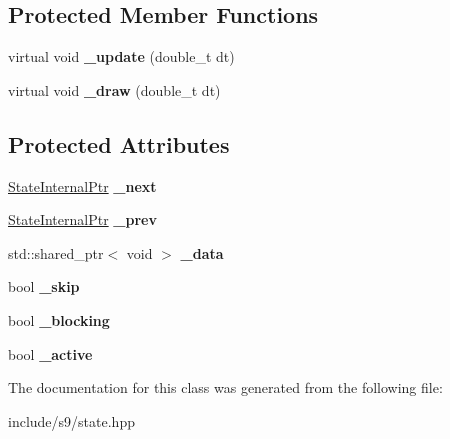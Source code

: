 \subsection*{\-Protected \-Member \-Functions}
\begin{DoxyCompactItemize}
\item 
\hypertarget{classs9_1_1State_a0d4e78ab84765021a534b8fb6dcc5497}{virtual void {\bfseries \-\_\-update} (double\-\_\-t dt)}\label{classs9_1_1State_a0d4e78ab84765021a534b8fb6dcc5497}

\item 
\hypertarget{classs9_1_1State_a1d85c69d1c6be10a66fef1322ec6866e}{virtual void {\bfseries \-\_\-draw} (double\-\_\-t dt)}\label{classs9_1_1State_a1d85c69d1c6be10a66fef1322ec6866e}

\end{DoxyCompactItemize}
\subsection*{\-Protected \-Attributes}
\begin{DoxyCompactItemize}
\item 
\hypertarget{classs9_1_1State_aaeb51975049bf02a4b32c7fdf9f4b816}{\hyperlink{classs9_1_1State}{\-State\-Internal\-Ptr} {\bfseries \-\_\-next}}\label{classs9_1_1State_aaeb51975049bf02a4b32c7fdf9f4b816}

\item 
\hypertarget{classs9_1_1State_a650c0737d8dce6939b36a680690a1d02}{\hyperlink{classs9_1_1State}{\-State\-Internal\-Ptr} {\bfseries \-\_\-prev}}\label{classs9_1_1State_a650c0737d8dce6939b36a680690a1d02}

\item 
\hypertarget{classs9_1_1State_ae9a215471150db3a80b843fabc80ce7c}{std\-::shared\-\_\-ptr$<$ void $>$ {\bfseries \-\_\-data}}\label{classs9_1_1State_ae9a215471150db3a80b843fabc80ce7c}

\item 
\hypertarget{classs9_1_1State_af619a178ddde7b8648838300d4632760}{bool {\bfseries \-\_\-skip}}\label{classs9_1_1State_af619a178ddde7b8648838300d4632760}

\item 
\hypertarget{classs9_1_1State_a7ada53c70cb3e8b7ea20250733ae89ef}{bool {\bfseries \-\_\-blocking}}\label{classs9_1_1State_a7ada53c70cb3e8b7ea20250733ae89ef}

\item 
\hypertarget{classs9_1_1State_a1a28bd0613dfe3ee349999a3b1f57dd0}{bool {\bfseries \-\_\-active}}\label{classs9_1_1State_a1a28bd0613dfe3ee349999a3b1f57dd0}

\end{DoxyCompactItemize}


\-The documentation for this class was generated from the following file\-:\begin{DoxyCompactItemize}
\item 
include/s9/state.\-hpp\end{DoxyCompactItemize}
